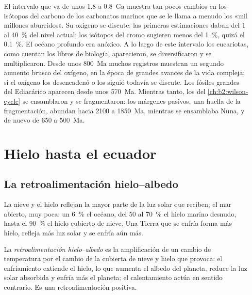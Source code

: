 El intervalo que va de unos 1.8 a \qty{0.8}{Ga} muestra tan pocos cambios en los isótopos del carbono de los
carbonatos marinos que se le llama a menudo los «mil millones aburridos». Su oxígeno se discute: las primeras
estimaciones daban del 1 al \qty{40}{\percent} del nivel actual; los isótopos del cromo sugieren menos del
\qty{1}{\percent}, quizá el \qty{0.1}{\percent}. El océano profundo era anóxico. A lo largo de este intervalo
los eucariotas, como cuentan los libros de biología, aparecieron, se diversificaron y se multiplicaron. Desde unos \qty{800}{Ma} muchos registros muestran
un segundo aumento brusco del oxígeno, en la época de grandes avances de la vida compleja; si
el oxígeno los desencadenó o los siguió todavía se discute. Los fósiles grandes del Ediacárico
aparecen desde unos \qty{570}{Ma}. Mientras tanto, los  del \cref{ch:b2:wilson-cycle}
se ensamblaron y se fragmentaron: los márgenes pasivos, una huella de la fragmentación, abundan hacia 2100 a
\qty{1850}{Ma}, mientras se ensamblaba Nuna, y de nuevo de 650 a \qty{500}{Ma}.

\section{Hielo hasta el ecuador}\label{sec:b2:precambrian-earth:snowball}

\subsection*{La retroalimentación hielo--albedo}

La nieve y el hielo reflejan la mayor parte de la luz solar que reciben; el mar abierto, muy poca: un
\qty{6}{\percent} el océano, del 50 al \qty{70}{\percent} el hielo marino desnudo, hasta el
\qty{90}{\percent} el hielo cubierto de nieve. Una Tierra que se enfría forma más hielo, refleja más
luz solar y se enfría aún más.

\begin{definition}\label{def:b2:precambrian-earth:ice-albedo}
La \emph{retroalimentación hielo--albedo} es la amplificación de un cambio
de temperatura por el cambio de la cubierta de nieve y hielo que provoca: el enfriamiento extiende el hielo, lo que
aumenta el albedo del planeta, reduce la luz solar absorbida y enfría más el planeta;
el calentamiento actúa en sentido contrario. Es una retroalimentación positiva.
\end{definition}

